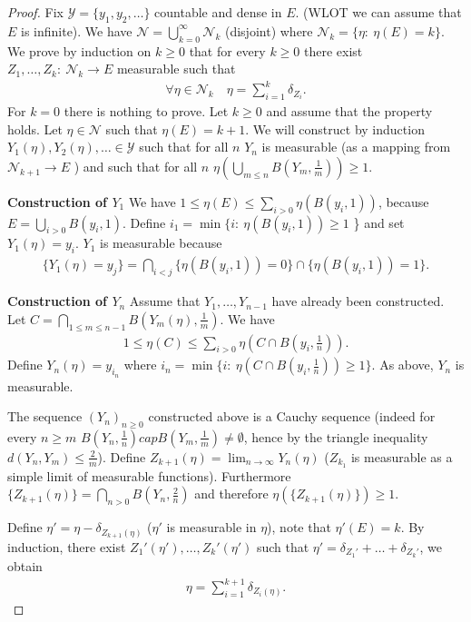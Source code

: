 \begin{proof}
	Fix $ \mathcal{Y}=\{y_1,y_2,\ldots\}$ countable and dense in $E$. (WLOT we can assume that $E$ is infinite). We have $\mathcal{N}= \bigcup_{k=0}^{\infty}\mathcal{N}_{k}$ (disjoint) where $\mathcal{N}_{k}=\{ \eta:\ \eta(E)=k\}$. We prove by induction on $k\geq 0$ that for every $k\geq 0$ there exist $Z_1,\ldots ,Z_k:\ \mathcal{N}_{k} \to E$ measurable such that 
	\begin{align}
		\forall \eta \in \mathcal{N}_{k} \quad \eta = \sum_{i=1}^{k} \delta_{Z_i}.
	\end{align}
	For $k=0$ there is nothing to prove. Let $k\geq 0$ and assume that the property holds. Let $\eta \in \mathcal{N}$ such that $\eta(E) = k+1$. We will construct by induction $Y_1(\eta), Y_2(\eta),\ldots \in \mathcal{Y}$ such that for all $n$ $Y_n$ is measurable (as a mapping from $\mathcal{N}_{k+1} \to E$ ) and such that for all $n$ $\eta( \bigcup_{m\leq n}B(Y_m,\frac{1}{m})) \geq 1$.	

\noindent \textbf{Construction of $Y_1$}
We have $1\leq \eta(E) \leq \sum_{i> 0}^{} \eta ( B(y_i,1))$, because $E=\bigcup_{i> 0}B(y_i,1)$. Define $i_{1}= \min\{i:\ \eta(B(y_i,1))\geq 1$ \} and set $Y_1(\eta) = y_i$. $Y_1$ is measurable because 
\begin{align}
	\{ Y_1(\eta ) =y_j\} = \bigcap _{i<j}\{ \eta(B(y_i, 1))=0 \} \cap \{ \eta (B(y_i, 1))=1\}.
\end{align}

\noindent \textbf{Construction of $Y_n$} 
Assume that $Y_1,\ldots ,Y_{n-1}$ have already been constructed. Let $C=\bigcap_{1\leq m \leq n-1}B(Y_m (\eta), \frac{1}{m})$. We have 
\begin{align}
	1 \leq \eta(C) \leq \sum_{i> 0}^{} \eta \left( C \cap B\left(y_i, \frac{1}{n}\right)\right).
\end{align}
Define $Y_n(\eta) = y_{i_{n}}$ where $i_{n}=\min\{ i:\ \eta(C \cap B(y_i, \frac{1}{n})) \geq 1\}$. As above, $Y_n$ is measurable.

The sequence $(Y_n)_{n\geq 0}$ constructed above is a Cauchy sequence (indeed for every $n\geq m$ $B(Y_n, \frac{1}{n}) cap B(Y_m, \frac{1}{m}) \neq \emptyset$, hence by the triangle inequality $d(Y_n, Y_m) \leq \frac{2}{m}$). Define $Z_{k+1}(\eta) = \lim_{n\to \infty }Y_{n}(\eta)$ ($Z_{k_1}$ is measurable as a simple limit of measurable functions). Furthermore $\{Z_{k+1}(\eta)\} = \bigcap_{n> 0}B(Y_n, \frac{2}{n})$ and therefore $\eta(\{Z_{k+1}(\eta) \}) \geq 1$. 

Define $\eta' = \eta - \delta_{Z_{k+1}(\eta)}$ ($\eta'$ is measurable in $\eta$), {\color{blue}note that} $\eta'(E) =k$. By induction, there exist $Z_{1}'(\eta'),\ldots, Z_{k}'(\eta')$ such that $\eta' = \delta_{Z_1'}+\ldots + \delta_{Z_k'}$, we obtain
\begin{align}
	\eta = \sum_{i=1}^{k+1} \delta_{Z_i(\eta)}.
\end{align}
\end{proof}

